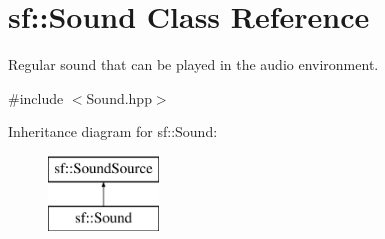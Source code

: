 \hypertarget{classsf_1_1Sound}{\section{sf\-:\-:Sound Class Reference}
\label{classsf_1_1Sound}
}


Regular sound that can be played in the audio environment.  




{\ttfamily \#include $<$Sound.\-hpp$>$}

Inheritance diagram for sf\-:\-:Sound\-:\begin{figure}[H]
\begin{center}
\leavevmode
\includegraphics[height=2.000000cm]{classsf_1_1Sound}
\end{center}
\end{figure}

